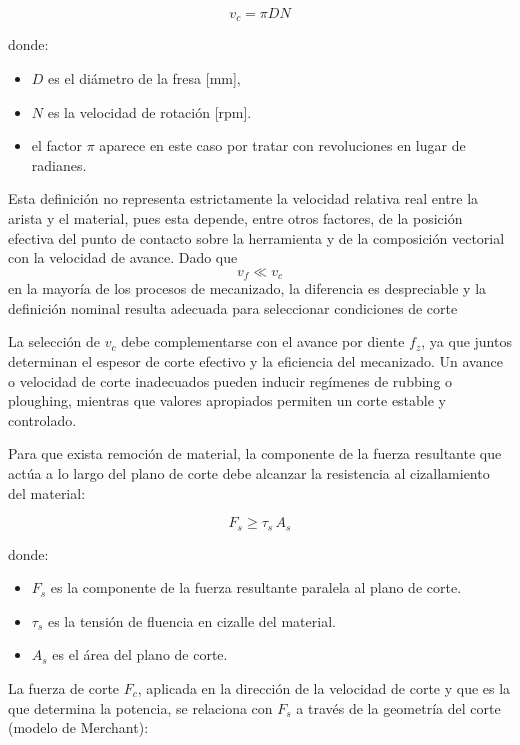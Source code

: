 \begin{equation}
	v_c = \pi D N
\end{equation}

donde:
\begin{itemize}
	\item $D$ es el diámetro de la fresa [mm],
	\item $N$ es la velocidad de rotación [rpm]. 
	\item el factor $\pi$ aparece en este caso por tratar con revoluciones en lugar de radianes.
\end{itemize}

Esta definición no representa estrictamente la velocidad relativa real entre la arista y el material, pues esta depende, entre otros factores, de la posición efectiva del punto de contacto sobre la herramienta y de la composición vectorial con la velocidad de avance. Dado que $$v_f \ll v_c$$ en la mayoría de los procesos de mecanizado, la diferencia es despreciable y la definición nominal resulta adecuada para seleccionar condiciones de corte


La selección de $v_c$ debe complementarse con el avance por diente $f_z$, ya que juntos determinan el espesor de corte efectivo y la eficiencia del mecanizado. Un avance o velocidad de corte inadecuados pueden inducir regímenes de rubbing o ploughing, mientras que valores apropiados permiten un corte estable y controlado.

Para que exista remoción de material, la componente de la fuerza resultante que actúa a lo largo del plano de corte debe alcanzar la resistencia al cizallamiento del material:

\begin{equation}
	F_s \geq \tau_s \, A_s
\end{equation}

donde:

\begin{itemize}
	\item $F_s$ es la componente de la fuerza resultante paralela al plano de corte.
	\item $\tau_s$ es la tensión de fluencia en cizalle del material.
	\item $A_s$ es el área del plano de corte.
\end{itemize}

La fuerza de corte $F_c$, aplicada en la dirección de la velocidad de corte y que es la que determina la potencia, se relaciona con $F_s$ a través de la geometría del corte (modelo de Merchant):

